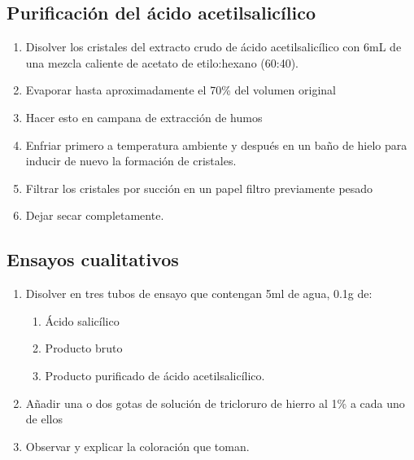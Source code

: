 \subsection{Purificación del ácido acetilsalicílico}
\begin{enumerate}
    \item Disolver los cristales del extracto crudo de ácido acetilsalicílico con 6mL de una mezcla caliente de acetato de etilo:hexano (60:40).
    \item Evaporar hasta aproximadamente el 70\% del volumen original
    \item Hacer esto en campana de extracción de humos
    \item Enfriar primero a temperatura ambiente y después en un baño de hielo para inducir de nuevo la formación de cristales.
    \item Filtrar los cristales por succión en un papel filtro previamente pesado
    \item Dejar secar completamente.
\end{enumerate}

\subsection{Ensayos cualitativos}
\begin{enumerate}
    \item Disolver en tres tubos de ensayo que contengan 5ml de agua, 0.1g de:
    \begin{enumerate}
        \item Ácido salicílico
        \item Producto bruto
        \item Producto purificado de ácido acetilsalicílico.
    \end{enumerate}
    
    \item Añadir una o dos gotas de solución de tricloruro de hierro al 1\% a cada uno de ellos
    \item Observar y explicar la coloración que toman.
\end{enumerate}
